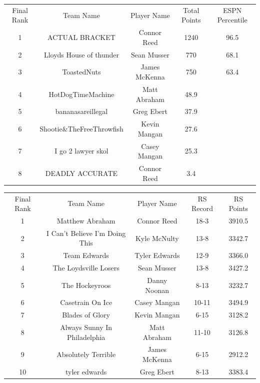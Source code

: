 \documentclass[11pt,letterpaper]{article}
\begin{document}
\newpage
{}
\vspace{-25pt}
\begin{table} [h]
\begin{center}
\begin{tabular} { c c c c c }
\\ Final Rank & Team Name & Player Name & Total Points & ESPN Percentile
\\ 1 & ACTUAL BRACKET & Connor Reed & 1240 & 96.5
\\ 2 & Lloyds House of thunder & Sean Musser & 770 & 68.1
\\ 3 & ToastedNuts & James McKenna & 750 & 63.4
\\ 4 & HotDogTimeMachine & Matt Abraham & 48.9
\\ 5 & bananasareillegal & Greg Ebert & 37.9
\\ 6 & Shootie\&TheFreeThrowfish & Kevin Mangan & 27.6
\\ 7 & I go 2 lawyer skol & Casey Mangan & 25.3
\\ 8 & DEADLY ACCURATE & Connor Reed & 3.4 
\end{tabular}
\end{center}
\end{table}

\newpage
{}
\vspace{-25pt}
\begin{table} [h]
\begin{center}
\begin{tabular} { c c c c c }
\\ Final Rank & Team Name & Player Name & RS Record & RS Points
\\ 1 & Matthew Abraham & Connor Reed & 18-3 & 3910.5
\\ 2 & I Can't Believe I'm Doing This & Kyle McNulty & 13-8 & 3342.7
\\ 3 & Team Edwards & Tyler Edwards & 12-9 & 3366.0
\\ 4 & The Loydsville Losers & Sean Musser & 13-8 & 3427.2
\\ 5 & The Hockeyroos & Danny Noonan & 8-13 & 3232.7
\\ 6 & Casetrain On Ice & Casey Mangan & 10-11 & 3494.9
\\ 7 & Blades of Glory & Kevin Mangan & 6-15 & 3128.2
\\ 8 & Always Sunny In Philadelphia & Matt Abraham & 11-10 & 3126.8
\\ 9 & Absolutely Terrible & James McKenna & 6-15 & 2912.2
\\ 10 & tyler edwards & Greg Ebert & 8-13 & 3383.4
\end{tabular}
\end{center}
\end{table}
\end{document}
